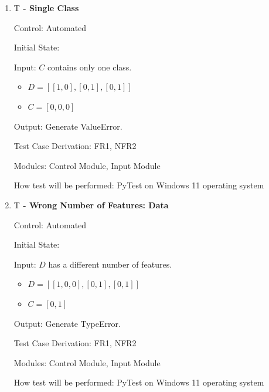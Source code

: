 \documentclass[12pt, titlepage]{article}
\newcounter{testnum} %
\begin{document}
\begin{enumerate}
Input: $D$ has more samples than $C$.
\begin{itemize}
    \item $D = [[1, 0], [0, 1], [0, 1]]$
    \item $C = [0, 1]$
\end{itemize}
					
Output: Generate ValueError.

Test Case Derivation: FR1, NFR2

Modules: Control Module, Input Module

How test will be performed: PyTest on Windows 11 operating system

\item{T\thetestnum \textbf{\label{T:}  
 - Single Class}}

Control: Automated
					
Initial State: 
					
Input: $C$ contains only one class.
\begin{itemize}
    \item $D = [[1, 0], [0, 1], [0, 1]]$
    \item $C = [0, 0, 0]$
\end{itemize}
					
Output: Generate ValueError.

Test Case Derivation: FR1, NFR2

Modules: Control Module, Input Module

How test will be performed: PyTest on Windows 11 operating system

\item{T\thetestnum \textbf{\label{T:}  
 - Wrong Number of Features: Data}}

Control: Automated
					
Initial State: 
					
Input: $D$ has a different number of features.
\begin{itemize}
    \item $D = [[1, 0, 0], [0, 1], [0, 1]]$
    \item $C = [0, 1]$
\end{itemize}
					
Output: Generate TypeError.

Test Case Derivation: FR1, NFR2

Modules: Control Module, Input Module

How test will be performed: PyTest on Windows 11 operating system


\end{enumerate}
\end{document}
